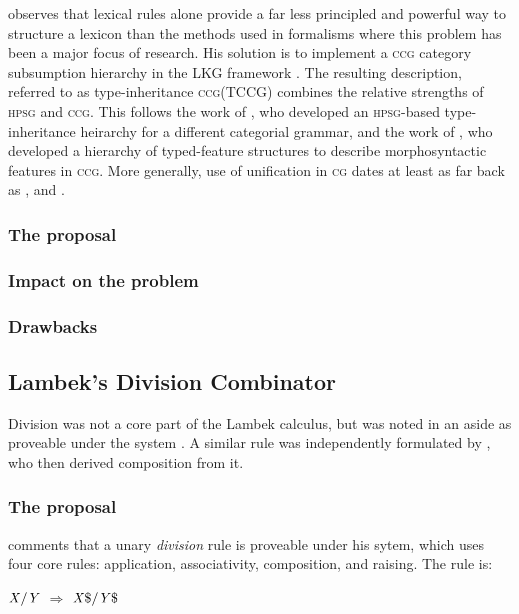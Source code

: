 \documentclass[11pt,twoside,final]{ahudson-harvard}
\newcommand{\cf}[1]{\mbox{$\it{#1}$}}   %
\newcommand{\ccg}{\textsc{ccg}\xspace}
\newcommand{\hpsg}{\textsc{hpsg}\xspace}
\newcommand{\cg}{\textsc{cg}\xspace}
\newcommand{\tccg}{\textsc{TCCG}\xspace}
\begin{document}
\citet{beavers} observes that lexical rules alone provide a far less principled and powerful way to structure a lexicon than the methods used in formalisms where this problem has been a major focus of research. His solution is to implement a \ccg category subsumption hierarchy in the LKG framework \citep{lkg}. The resulting description, referred to as type-inheritance \ccg (\tccg ) combines the relative strengths of \hpsg and \ccg. This follows the work of \citet{villavicencio}, who developed an \hpsg-based type-inheritance heirarchy for a different categorial grammar, and the work of \citet{erkan}, who developed a hierarchy of typed-feature structures to describe morphosyntactic features in \ccg. More generally, use of unification in \cg dates at least as far back as \citet{kartunnen}, \citet{uszkoreit} and \citet{zeevat}.

\subsubsection{The proposal}

\subsubsection{Impact on the problem}

\subsubsection{Drawbacks}



\subsection{Lambek's Division Combinator}

Division was not a core part of the Lambek calculus, but was noted in an aside as proveable under the system \citep{wood:93}. A similar rule was independently formulated by \citet{geach72}, who then derived composition from it.

\subsubsection{The proposal}

\citet{lambek} comments that a unary \emph{division} rule is proveable under his sytem, which uses four core rules: application, associativity, composition, and raising. The rule is:

\cf{X/Y} $\Rightarrow$ \cf{X\$/Y\$}
\end{document}
